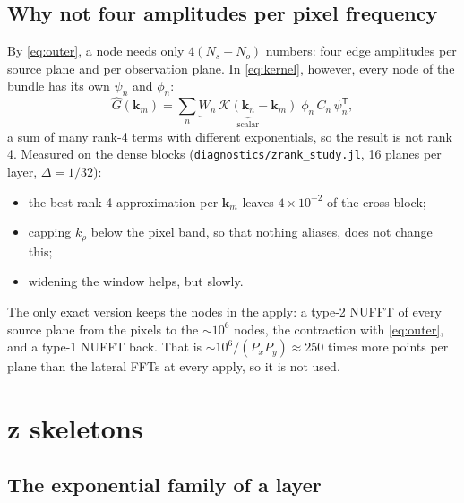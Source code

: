 \documentclass[11pt,a4paper]{article}
\newcommand{\code}[1]{\texttt{#1}}
\newcommand{\kn}{\mathbf{k}_n}
\newcommand{\km}{\mathbf{k}_m}
\newcommand{\Ghat}{\widehat{G}}
\theoremstyle{remark}
\begin{document}
\subsection{Why not four amplitudes per pixel frequency}
\label{sec:four}

By \eqref{eq:outer}, a node needs only $4(N_s+N_o)$ numbers: four edge amplitudes per source plane
and per observation plane. In \eqref{eq:kernel}, however, every node of the bundle has its own $\psi_n$ and $\phi_n$:
\begin{equation}
  \Ghat(\km) = \sum_n \underbrace{W_n\,\mathcal{K}(\kn-\km)}_{\text{scalar}}\;\phi_n\,C_n\,\psi_n^{\mathsf T},
\end{equation}
a sum of many rank-4 terms with different exponentials, so the result is not rank 4. Measured on the dense blocks
(\code{diagnostics/zrank\_study.jl}, 16 planes per layer, $\Delta=1/32$):
\begin{itemize}[leftmargin=*]
\item the best rank-4 approximation per $\km$ leaves $4\times10^{-2}$ of the cross block;
\item capping $k_\rho$ below the pixel band, so that nothing aliases, does not change this;
\item widening the window helps, but slowly.
\end{itemize}
The only exact version keeps the nodes in the apply: a type-2 NUFFT of every source plane from the pixels to the
$\sim10^6$ nodes, the contraction with \eqref{eq:outer}, and a type-1 NUFFT back. That is
$\sim 10^6/(P_xP_y)\approx 250$ times more points per plane than the lateral FFTs at every apply, so it is not used.

\section{z skeletons}
\label{sec:skeleton}

\subsection{The exponential family of a layer}
\end{document}

